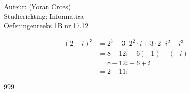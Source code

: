 \documentclass[a4paper]{article}
\begin{document}
\noindent \large Auteur: (Yoran Croes) \\
\noindent \large Studierichting: Informatica\\
\noindent \large Oefeningenreeks 1B nr.17.12\\

\medskip

\normalsize

\begin{align*}
(2-i)^3 &= 2^3 - 3 \cdot 2^2 \cdot i + 3 \cdot 2 \cdot i^2 - i^3 \\
        &= 8 - 12i + 6(-1) - (-i) \\
        &= 8 - 12i - 6 + i \\
        &= 2 - 11i
\end{align*}

\begin{thebibliography}{999}
\end{thebibliography}
\end{document}
